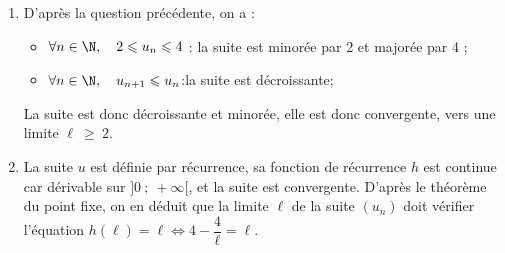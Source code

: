 \begin{enumerate}
\begin{enumerate}
$2 \leqslant u_{n+1} \leqslant u_{n+2} \leqslant 4$ : $P_{n+1}$ est vraie.
%
%
%
%

\textbf{Conclusion : } la relation est vraie au rang 0 et si elle est vraie au rang $n \geqslant 0$, elle l'est aussi au rang $n+1$ : d'après le principe de récurrence :
\[\forall n \in \N,\quad 2 \leqslant u_{n+1} \leqslant u_{n} \leqslant 4.\]

		\item D'après la question précédente, on a :

		\begin{itemize}
			\item $\forall n \in \N,\quad 2\leqslant u_n \leqslant 4$ : \quad la suite est minorée par 2 et majorée par 4 ;
			\item $\forall n \in \N,\quad u_{n+1} \leqslant u_{n}$:\quad la suite est décroissante;
		\end{itemize}

La suite est donc décroissante et minorée, elle est donc convergente, vers une limite $\ell~\geqslant~2$.


		\item La suite $u$ est définie par récurrence, sa fonction de récurrence $h$  est continue car dérivable sur $]0~;~+\infty[$, et la suite est  convergente. D'après le théorème du point fixe, on en déduit que la limite $\ell$  de la suite $(u_n)$ doit vérifier l'équation $h(\ell) = \ell \iff 4 - \dfrac{4}{\ell} = \ell$.


\end{enumerate}
\end{enumerate}
